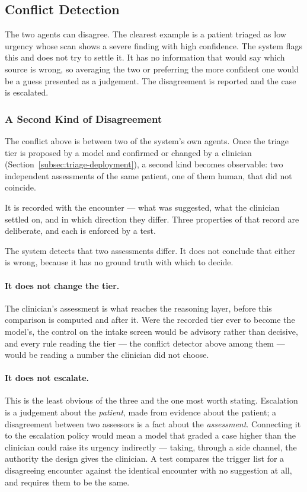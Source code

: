 \subsection{Conflict Detection}
\label{subsec:reasoning-conflict}

The two agents can disagree. The clearest example is a patient triaged as low urgency whose
scan shows a severe finding with high confidence. The system flags this and does not try to
settle it. It has no information that would say which source is wrong, so averaging the two
or preferring the more confident one would be a guess presented as a judgement. The
disagreement is reported and the case is escalated.

\subsubsection{A Second Kind of Disagreement}
\label{subsec:reasoning-human-ai}

The conflict above is between two of the system's own agents. Once the triage tier is proposed
by a model and confirmed or changed by a clinician
(Section~\ref{subsec:triage-deployment}), a second kind becomes observable: two independent
assessments of the same patient, one of them human, that did not coincide.

It is recorded with the encounter --- what was suggested, what the clinician settled on, and in
which direction they differ. Three properties of that record are deliberate, and each is
enforced by a test.

\begin{keystatement}
The system detects that two assessments differ. It does not conclude that either is wrong,
because it has no ground truth with which to decide.
\end{keystatement}

\paragraph{It does not change the tier.} The clinician's assessment is what reaches the
reasoning layer, before this comparison is computed and after it. Were the recorded tier ever
to become the model's, the control on the intake screen would be advisory rather than
decisive, and every rule reading the tier --- the conflict detector above among them --- would
be reading a number the clinician did not choose.

\paragraph{It does not escalate.} This is the least obvious of the three and the one most worth
stating. Escalation is a judgement about the \emph{patient}, made from evidence about the
patient; a disagreement between two assessors is a fact about the \emph{assessment}. Connecting
it to the escalation policy would mean a model that graded a case higher than the clinician
could raise its urgency indirectly --- taking, through a side channel, the authority the design
gives the clinician. A test compares the trigger list for a disagreeing encounter against the
identical encounter with no suggestion at all, and requires them to be the same.

